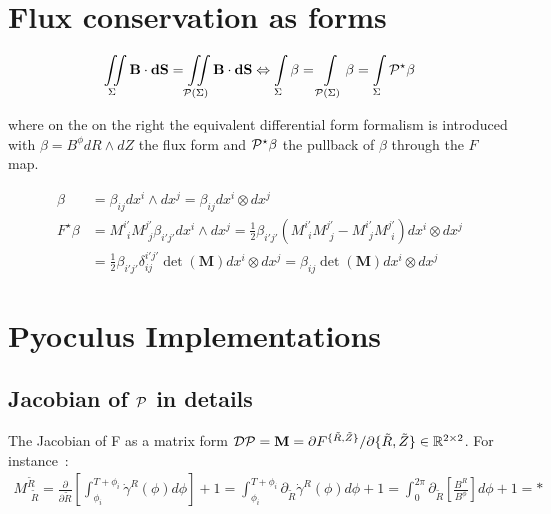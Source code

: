 \chapter{Flux conservation as forms}\label{forms}

\begin{equation*}
    \iint\limits_{\Sigma}\textbf{B}\cdot\textbf{dS} = \iint\limits_{\mathcal{P}(\Sigma)}\textbf{B}\cdot\textbf{dS} \Leftrightarrow \int\limits_{\Sigma}\beta = \int\limits_{\mathcal{P}(\Sigma)}\beta = \int\limits_{\Sigma}\mathcal{P}^\star\beta
\end{equation*}

where on the on the right the equivalent differential form formalism is introduced with $\beta = B^\phi dR\wedge dZ$ the flux form and $\mathcal{P}^\star\beta$ the pullback of $\beta$ through the $F$ map.

\begin{align*}
    \beta &= \beta_{ij}dx^i\wedge dx^j = \beta_{ij}dx^i\otimes dx^j\\
    F^\star\beta &= M^{i'}_{\,\:i}M^{j'}_{\,\:j}\beta_{i'j'}dx^i\wedge dx^j = \frac{1}{2}\beta_{i'j'}\left(M^{i'}_{\,\:i}M^{j'}_{\,\:j}-M^{i'}_{\,\:j}M^{j'}_{\,\:i}\right)dx^i\otimes dx^j\\ &= \frac{1}{2}\beta_{i'j'}\delta^{i'j'}_{ij} \det(\textbf{M})dx^i\otimes dx^j = \beta_{ij}\det(\textbf{M})dx^i\otimes dx^j
\end{align*}

\chapter{Pyoculus Implementations}

\section{Jacobian of $\mathcal{P}$ in details}
The Jacobian of F as a matrix form $\mathcal{D}\mathcal{P} = \textbf{M} = \partial F^{\{\tilde{R},\tilde{Z}\}}/{\partial \{\tilde{R},\tilde{Z}\}} \in \mathbb{R}^{2\times2}$. For instance~:
\begin{align*}
    M^{\tilde{R}}_{\,\:\tilde{R}} = \frac{\partial}{\partial \tilde{R}}\left[\int_{\phi_i}^{T+\phi_i}\dot{\gamma}^R(\phi)d\phi\right] + 1 = \int_{\phi_i}^{T+\phi_i}\partial_{\tilde{R}}\dot{\gamma}^R(\phi)d\phi + 1 = \int_0^{2\pi}\partial_{\tilde{R}}\left[\frac{B^R}{B^\phi}\right]d\phi + 1 = *
\end{align*}

